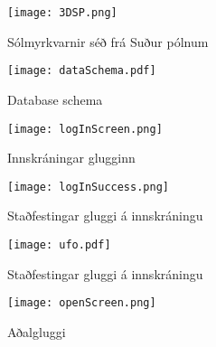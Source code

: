 \documentclass[12pt, git, final]{rureport}
\begin{document}
\begin{figure}
	\centering
	\texttt{[image: 3DSP.png]}
	\caption{Sólmyrkvarnir séð frá Suður pólnum}
	\label{fig:3DSP}
\end{figure}

\begin{figure}
	\centering 
	\texttt{[image: dataSchema.pdf]}
	\caption{Database schema \label{fig:dataschema}}
\end{figure} 
%
\begin{figure}
	\centering 
	\texttt{[image: logInScreen.png]}
	\caption{Innskráningar glugginn \label{fig:logScreen}}
\end{figure} 

\begin{figure}
	\centering 
	\texttt{[image: logInSuccess.png]}
	\caption{Staðfestingar gluggi á innskráningu \label{fig:logsucces}}
\end{figure} 

\begin{figure}
	\centering 
	\texttt{[image: ufo.pdf]}
	\caption{Staðfestingar gluggi á innskráningu \label{fig:diagram}}
\end{figure}

\begin{figure}[t]
	\centering 
	\texttt{[image: openScreen.png]}
	\caption{Aðalgluggi \label{fig:openScreen}}
\end{figure} 

\clearpage

\printbibliography
\end{document}
